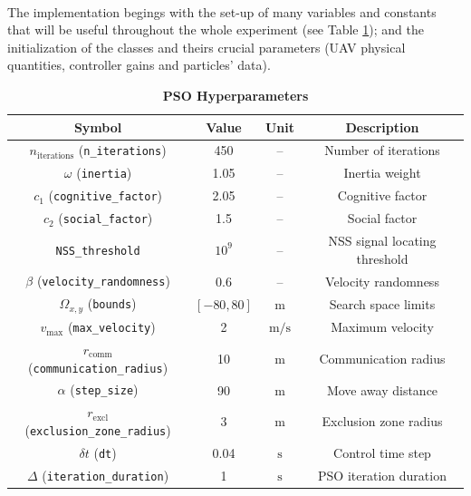 \noindent\\
The implementation begings with the set-up of 
many variables and constants that will be useful throughout 
the whole experiment (see Table \ref{tab:pso_parameters}); and the initialization of the classes and theirs
crucial parameters (UAV physical quantities, controller gains and 
particles' data).
\begin{table}
\centering
\caption{\textbf{PSO Hyperparameters}}
\begin{tabular}{c c c c}
\hline\hline
\textbf{Symbol}              & \textbf{Value}        & \textbf{Unit}           & \textbf{Description}      \\ \hline\hline                   
\(n_{\text{iterations}}\) (\texttt{n\_iterations})      & 450                   & --                      & Number of iterations      \\
\(\omega\) (\texttt{inertia})                          & 1.05                  & --                      & Inertia weight            \\
\(c_1\) (\texttt{cognitive\_factor})                   & 2.05                  & --                      & Cognitive factor          \\
\(c_2\) (\texttt{social\_factor})                      & 1.5                   & --                      & Social factor             \\
 \texttt{NSS\_threshold}                               & $10^9$                & --                      & NSS signal locating threshold\\
\(\beta\) (\texttt{velocity\_randomness})              & 0.6                   & --                      & Velocity randomness       \\ \hline
\(\Omega_{x,y}\) (\texttt{bounds})                     & \([-80, 80]\)         & \(\text{m}\)            & Search space limits       \\
\(v_{\text{max}}\) (\texttt{max\_velocity})            & 2                     & \(\text{m/s}\)          & Maximum velocity          \\                
\(r_{\text{comm}}\) (\texttt{communication\_radius})   & 10                    & \(\text{m}\)           & Communication radius      \\
\(\alpha\) (\texttt{step\_size})                       & 90                    & \(\text{m}\)           & Move away distance        \\
\(r_{\text{excl}}\) (\texttt{exclusion\_zone\_radius}) & 3                     & \(\text{m}\)           & Exclusion zone radius     \\
\(\delta t\) (\texttt{dt})                             & 0.04                  & \(\text{s}\)           & Control time step         \\
\(\Delta\) (\texttt{iteration\_duration})             & 1                     & \(\text{s}\)           & PSO iteration duration    \\
\hline\hline
\end{tabular}
\label{tab:pso_parameters}
\end{table}
    
